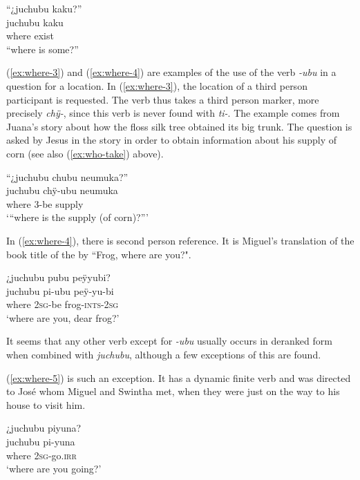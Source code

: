 \ea\label{ex:where-2}
\begingl
\glpreamble “¿juchubu kaku?”\\
\gla juchubu kaku\\
\glb where exist\\
\glft “where is some?”
\endgl
\trailingcitation{[rxx-n120511l-1.033]}
\xe

(\ref{ex:where-3}) and (\ref{ex:where-4}) are examples of the use of the verb \textit{-ubu} in a question for a location. In (\ref{ex:where-3}), the location of a third person participant is requested. The verb thus takes a third person marker, more precisely \textit{chÿ-}, since this verb is never found with \textit{ti-}. The example comes from Juana’s story about how the floss silk tree obtained its big trunk. The question is asked by Jesus in the story in order to obtain information about his supply of corn (see also (\ref{ex:who-take}) above).

\ea\label{ex:where-3}
\begingl
\glpreamble “¿juchubu chubu neumuka?”\\
\gla juchubu chÿ-ubu neumuka\\
\glb where 3-be supply\\
\glft ‘“where is the supply (of corn)?”’
\endgl
\trailingcitation{[jxx-n101013s-1.659]}
\xe

In (\ref{ex:where-4}), there is second person reference. It is Miguel’s translation of the book title of the  by \citet[]{Mayer2003} “Frog, where are you?".

\ea\label{ex:where-4}
\begingl
\glpreamble ¿juchubu pubu peÿyubi?\\
\gla juchubu pi-ubu peÿ-yu-bi\\
\glb where 2\textsc{sg}-be frog-\textsc{ints}-2\textsc{sg}\\
\glft ‘where are you, dear frog?’
\endgl
\trailingcitation{[mox-a110920l-2.197]}
\xe

It seems that any other verb except for \textit{-ubu} usually occurs in deranked form when combined with \textit{juchubu}, although a few exceptions of this are found.

(\ref{ex:where-5}) is such an exception. It has a dynamic finite verb and was directed to José whom Miguel and Swintha met, when they were just on the way to his house to visit him.

\ea\label{ex:where-5}
\begingl
\glpreamble ¿juchubu piyuna?\\
\gla juchubu pi-yuna\\
\glb where 2\textsc{sg}-go.\textsc{irr}\\
\glft ‘where are you going?’
\endgl
\trailingcitation{[mox-c110926s-1.132]}
\xe

